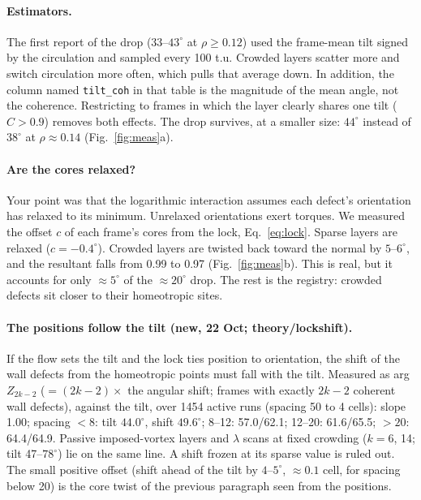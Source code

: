 \documentclass[11pt,a4paper]{article}
\begin{document}
\paragraph{Estimators.} The first report of the drop ($33$--$43^\circ$ at $\rho\ge0.12$) used the frame-mean tilt signed by the circulation and sampled every 100 t.u. Crowded layers scatter more and switch circulation more often, which pulls that average down. In addition, the column named \texttt{tilt\_coh} in that table is the magnitude of the mean angle, not the coherence. Restricting to frames in which the layer clearly shares one tilt ($C>0.9$) removes both effects. The drop survives, at a smaller size: $44^\circ$ instead of $38^\circ$ at $\rho\approx0.14$ (Fig.~\ref{fig:meas}a).

\paragraph{Are the cores relaxed?} Your point was that the logarithmic interaction assumes each defect's orientation has relaxed to its minimum. Unrelaxed orientations exert torques. We measured the offset $c$ of each frame's cores from the lock, Eq.~\eqref{eq:lock}. Sparse layers are relaxed ($c=-0.4^\circ$). Crowded layers are twisted back toward the normal by $5$--$6^\circ$, and the resultant falls from 0.99 to 0.97 (Fig.~\ref{fig:meas}b). This is real, but it accounts for only $\approx5^\circ$ of the $\approx20^\circ$ drop. The rest is the registry: crowded defects sit closer to their homeotropic sites.

\paragraph{The positions follow the tilt (new, 22 Oct; theory/lockshift).} If the flow sets the tilt and the lock ties position to orientation, the
shift of the wall defects from the homeotropic points must fall with the tilt. Measured as arg $Z_{2k-2}$ ($=(2k-2)\times$ the angular shift; frames with exactly
$2k-2$ coherent wall defects), against the tilt, over 1454 active runs (spacing 50 to 4 cells): slope 1.00; spacing $<8$: tilt $44.0^\circ$, shift $49.6^\circ$;
8--12: 57.0/62.1; 12--20: 61.6/65.5; $>20$: 64.4/64.9. Passive imposed-vortex layers and $\lambda$ scans at fixed crowding ($k=6$, 14; tilt 47--$78^\circ$) lie on the same
line. A shift frozen at its sparse value is ruled out. The small positive offset (shift ahead of the tilt by $4$--$5^\circ$, $\approx0.1$ cell, for spacing below 20)
is the core twist of the previous paragraph seen from the positions.
\end{document}
